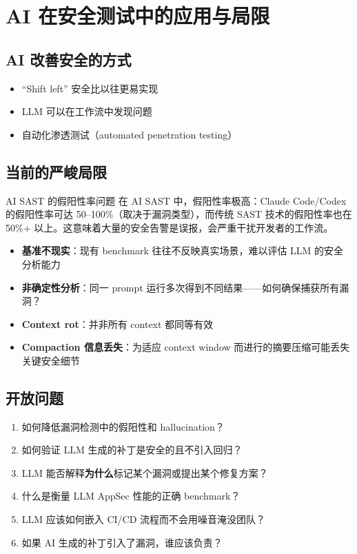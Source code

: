 \section{AI 在安全测试中的应用与局限}

\subsection{AI 改善安全的方式}

\begin{itemize}
    \item ``Shift left'' 安全比以往更易实现
    \item LLM 可以在工作流中发现问题
    \item 自动化渗透测试（automated penetration testing）
\end{itemize}

\subsection{当前的严峻局限}

\begin{warningbox}{AI SAST 的假阳性率问题}
在 AI SAST 中，假阳性率极高：Claude Code/Codex 的假阳性率可达 50--100\%（取决于漏洞类型），而传统 SAST 技术的假阳性率也在 50\%+ 以上。这意味着大量的安全告警是误报，会严重干扰开发者的工作流。
\end{warningbox}

\begin{itemize}
    \item \textbf{基准不现实}：现有 benchmark 往往不反映真实场景，难以评估 LLM 的安全分析能力
    \item \textbf{非确定性分析}：同一 prompt 运行多次得到不同结果——如何确保捕获所有漏洞？
    \item \textbf{Context rot}：并非所有 context 都同等有效
    \item \textbf{Compaction 信息丢失}：为适应 context window 而进行的摘要压缩可能丢失关键安全细节
\end{itemize}

\subsection{开放问题}

\begin{enumerate}
    \item 如何降低漏洞检测中的假阳性和 hallucination？
    \item 如何验证 LLM 生成的补丁是安全的且不引入回归？
    \item LLM 能否解释\textbf{为什么}标记某个漏洞或提出某个修复方案？
    \item 什么是衡量 LLM AppSec 性能的正确 benchmark？
    \item LLM 应该如何嵌入 CI/CD 流程而不会用噪音淹没团队？
    \item 如果 AI 生成的补丁引入了漏洞，谁应该负责？
\end{enumerate}

